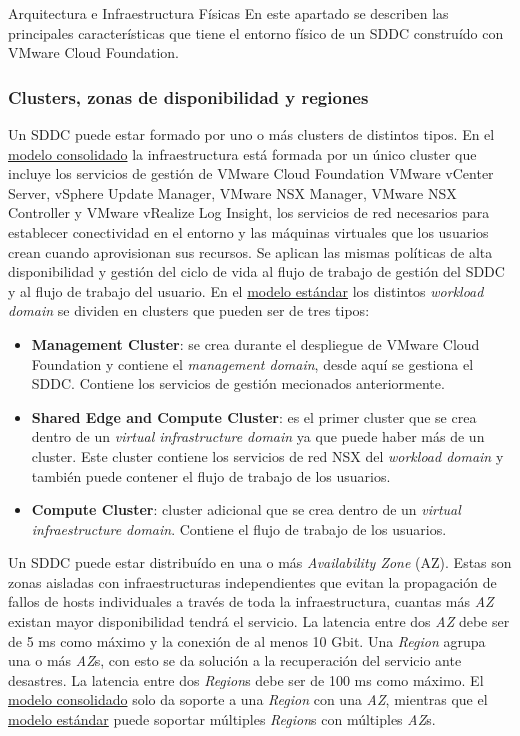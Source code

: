 \begin{subsection}{Arquitectura e Infraestructura Físicas \cite{CFfisInfraestuctura}}
En este apartado se describen las principales características que tiene el entorno físico de un SDDC construído con VMware Cloud Foundation.

\subsubsection{Clusters, zonas de disponibilidad y regiones}
Un SDDC puede estar formado por uno o más clusters de distintos tipos. En el  \underline{modelo consolidado} la infraestructura está formada por un único cluster que incluye los servicios de gestión de VMware Cloud Foundation VMware vCenter Server, vSphere Update Manager, VMware NSX Manager, VMware NSX Controller y VMware vRealize Log Insight, los servicios de red necesarios para establecer conectividad en el entorno y las máquinas virtuales que los usuarios crean cuando aprovisionan sus recursos. Se aplican las mismas políticas de alta disponibilidad y gestión del ciclo de vida al flujo de trabajo de gestión del SDDC y al flujo de trabajo del usuario. En el \underline{modelo estándar} los distintos \textit{workload domain} se dividen en clusters que pueden ser de tres tipos:
    \begin{itemize}
        \item \textbf{Management Cluster}: se crea durante el despliegue de VMware Cloud Foundation y contiene el \textit{management domain}, desde aquí se gestiona el SDDC. Contiene los servicios de gestión mecionados anteriormente.
        \item \textbf{Shared Edge and Compute Cluster}: es el primer cluster que se crea dentro de un \textit{virtual infrastructure domain} ya que puede haber más de un cluster. Este cluster contiene los servicios de red NSX del \textit{workload domain} y también puede contener el flujo de trabajo de los usuarios.
        \item \textbf{Compute Cluster}: cluster adicional que se crea dentro de un \textit{virtual infraestructure domain}. Contiene el flujo de trabajo de los usuarios.
    \end{itemize}
Un SDDC puede estar distribuído en una o más \textit{Availability Zone} (AZ). Estas son zonas aisladas con infraestructuras independientes que evitan la propagación de fallos de hosts individuales a través de toda la infraestructura, cuantas más \textit{AZ} existan mayor disponibilidad tendrá el servicio. La latencia entre dos \textit{AZ} debe ser de 5 ms como máximo y la conexión de al menos 10 Gbit. Una \textit{Region} agrupa una o más \textit{AZ}s, con esto se da solución a la recuperación del servicio ante desastres. La latencia entre dos \textit{Region}s debe ser de 100 ms como máximo. El \underline{modelo consolidado} solo da soporte a una \textit{Region} con una \textit{AZ}, mientras que el \underline{modelo estándar} puede soportar múltiples \textit{Region}s con múltiples \textit{AZ}s.


\end{subsection}
